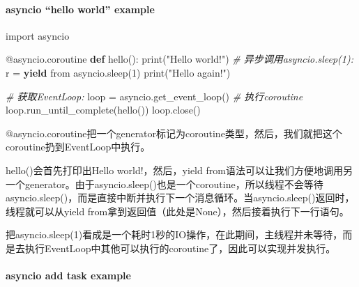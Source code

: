 \documentclass[11pt]{article}
\newenvironment{Shaded}{}{}
\newcommand{\KeywordTok}[1]{\textcolor[rgb]{0.00,0.44,0.13}{\textbf{{#1}}}}
\newcommand{\DecValTok}[1]{\textcolor[rgb]{0.25,0.63,0.44}{{#1}}}
\newcommand{\StringTok}[1]{\textcolor[rgb]{0.25,0.44,0.63}{{#1}}}
\newcommand{\CommentTok}[1]{\textcolor[rgb]{0.38,0.63,0.69}{\textit{{#1}}}}
\newcommand{\NormalTok}[1]{{#1}}
\newcommand{\ImportTok}[1]{{#1}}
\newcommand{\ControlFlowTok}[1]{\textcolor[rgb]{0.00,0.44,0.13}{\textbf{{#1}}}}
\newcommand{\OperatorTok}[1]{\textcolor[rgb]{0.40,0.40,0.40}{{#1}}}
\newcommand{\BuiltInTok}[1]{{#1}}
\newcommand{\AttributeTok}[1]{\textcolor[rgb]{0.49,0.56,0.16}{{#1}}}
\begin{document}
    \hypertarget{asyncio-hello-world-example}{%
\paragraph{asyncio ``hello world''
example}\label{asyncio-hello-world-example}}

    \begin{Shaded}
\begin{Highlighting}[]
\ImportTok{import}\NormalTok{ asyncio}

\AttributeTok{@asyncio.coroutine}
\KeywordTok{def}\NormalTok{ hello():}
    \BuiltInTok{print}\NormalTok{(}\StringTok{"Hello world!"}\NormalTok{)}
    \CommentTok{# 异步调用asyncio.sleep(1):}
\NormalTok{    r }\OperatorTok{=} \ControlFlowTok{yield} \ImportTok{from}\NormalTok{ asyncio.sleep(}\DecValTok{1}\NormalTok{)}
    \BuiltInTok{print}\NormalTok{(}\StringTok{"Hello again!"}\NormalTok{)}

\CommentTok{# 获取EventLoop:}
\NormalTok{loop }\OperatorTok{=}\NormalTok{ asyncio.get_event_loop()}
\CommentTok{# 执行coroutine}
\NormalTok{loop.run_until_complete(hello())}
\NormalTok{loop.close()}
\end{Highlighting}
\end{Shaded}

@asyncio.coroutine把一个generator标记为coroutine类型，然后，我们就把这个coroutine扔到EventLoop中执行。

hello()会首先打印出Hello world!，然后，yield
from语法可以让我们方便地调用另一个generator。由于asyncio.sleep()也是一个coroutine，所以线程不会等待asyncio.sleep()，而是直接中断并执行下一个消息循环。当asyncio.sleep()返回时，线程就可以从yield
from拿到返回值（此处是None），然后接着执行下一行语句。

把asyncio.sleep(1)看成是一个耗时1秒的IO操作，在此期间，主线程并未等待，而是去执行EventLoop中其他可以执行的coroutine了，因此可以实现并发执行。

    \hypertarget{asyncio-add-task-example}{%
\paragraph{asyncio add task example}\label{asyncio-add-task-example}}
\end{document}
